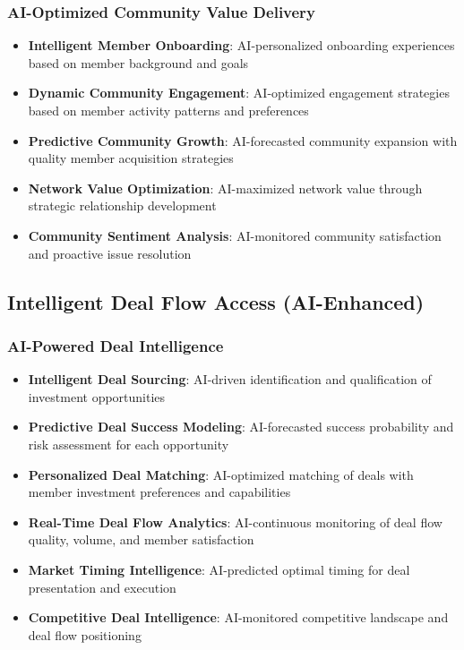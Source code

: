 \subsubsection{AI-Optimized Community Value Delivery}

\begin{itemize}
    \item \textbf{Intelligent Member Onboarding}: AI-personalized onboarding experiences based on member background and goals
    \item \textbf{Dynamic Community Engagement}: AI-optimized engagement strategies based on member activity patterns and preferences
    \item \textbf{Predictive Community Growth}: AI-forecasted community expansion with quality member acquisition strategies
    \item \textbf{Network Value Optimization}: AI-maximized network value through strategic relationship development
    \item \textbf{Community Sentiment Analysis}: AI-monitored community satisfaction and proactive issue resolution
\end{itemize}

\subsection{Intelligent Deal Flow Access (AI-Enhanced)}

\subsubsection{AI-Powered Deal Intelligence}

\begin{itemize}
    \item \textbf{Intelligent Deal Sourcing}: AI-driven identification and qualification of investment opportunities
    \item \textbf{Predictive Deal Success Modeling}: AI-forecasted success probability and risk assessment for each opportunity
    \item \textbf{Personalized Deal Matching}: AI-optimized matching of deals with member investment preferences and capabilities
    \item \textbf{Real-Time Deal Flow Analytics}: AI-continuous monitoring of deal flow quality, volume, and member satisfaction
    \item \textbf{Market Timing Intelligence}: AI-predicted optimal timing for deal presentation and execution
    \item \textbf{Competitive Deal Intelligence}: AI-monitored competitive landscape and deal flow positioning
\end{itemize}

